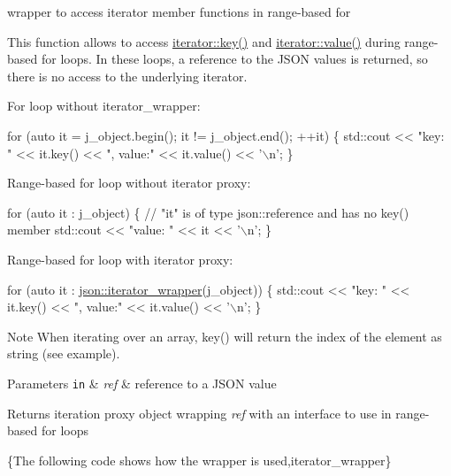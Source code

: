 wrapper to access iterator member functions in range-\/based for 

This function allows to access \hyperlink{classnlohmann_1_1detail_1_1iter__impl_ad14ac9338131d0be2c6bb41c715c2b27}{iterator\+::key()} and \hyperlink{classnlohmann_1_1detail_1_1iter__impl_adc4048d25e057ce8ec0b912642c24731}{iterator\+::value()} during range-\/based for loops. In these loops, a reference to the J\+S\+ON values is returned, so there is no access to the underlying iterator.

For loop without iterator\+\_\+wrapper\+:


\begin{DoxyCode}
\textcolor{keywordflow}{for} (\textcolor{keyword}{auto} it = j\_object.begin(); it != j\_object.end(); ++it)
\{
    std::cout << \textcolor{stringliteral}{"key: "} << it.key() << \textcolor{stringliteral}{", value:"} << it.value() << \textcolor{charliteral}{'\(\backslash\)n'};
\}
\end{DoxyCode}


Range-\/based for loop without iterator proxy\+:


\begin{DoxyCode}
\textcolor{keywordflow}{for} (\textcolor{keyword}{auto} it : j\_object)
\{
    \textcolor{comment}{// "it" is of type json::reference and has no key() member}
    std::cout << \textcolor{stringliteral}{"value: "} << it << \textcolor{charliteral}{'\(\backslash\)n'};
\}
\end{DoxyCode}


Range-\/based for loop with iterator proxy\+:


\begin{DoxyCode}
\textcolor{keywordflow}{for} (\textcolor{keyword}{auto} it : \hyperlink{classnlohmann_1_1basic__json_a22e2e5b0e68d9d7c63be2cada5187259}{json::iterator\_wrapper}(j\_object))
\{
    std::cout << \textcolor{stringliteral}{"key: "} << it.key() << \textcolor{stringliteral}{", value:"} << it.value() << \textcolor{charliteral}{'\(\backslash\)n'};
\}
\end{DoxyCode}


\begin{DoxyNote}{Note}
When iterating over an array, {\ttfamily key()} will return the index of the element as string (see example).
\end{DoxyNote}

\begin{DoxyParams}[1]{Parameters}
\mbox{\tt in}  & {\em ref} & reference to a J\+S\+ON value \\
\hline
\end{DoxyParams}
\begin{DoxyReturn}{Returns}
iteration proxy object wrapping {\itshape ref} with an interface to use in range-\/based for loops
\end{DoxyReturn}
\{The following code shows how the wrapper is used,iterator\+\_\+wrapper\}

